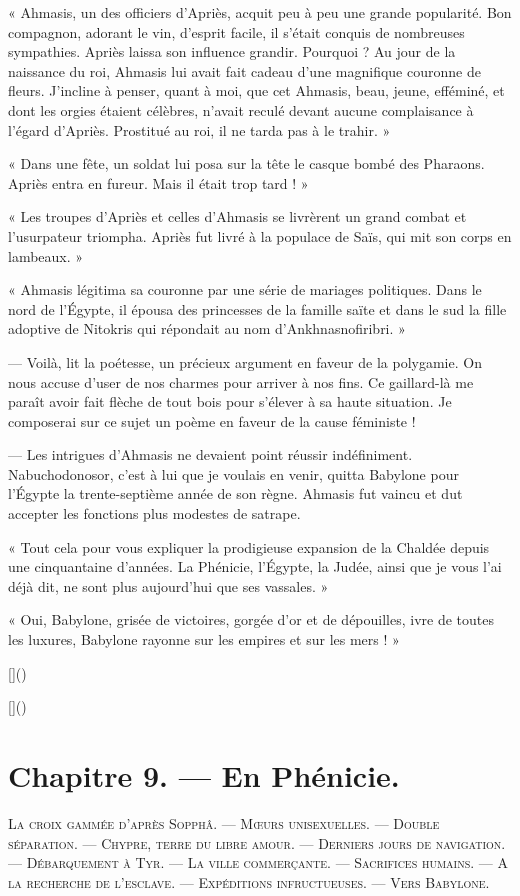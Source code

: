 \documentclass[a4paper, 11pt, oneside, polutonikogreek, french]{article}
\begin{document}
« Ahmasis, un des officiers d'Apriès, acquit peu à peu une grande popularité. Bon compagnon, adorant le vin, d'esprit facile, il s'était conquis de nombreuses sympathies. Apriès laissa son influence grandir. Pourquoi ? Au jour de la naissance du roi, Ahmasis lui avait fait cadeau d'une magnifique couronne de fleurs. J'incline à penser, quant à moi, que cet Ahmasis, beau, jeune, efféminé, et dont les orgies étaient célèbres, n'avait reculé devant aucune complaisance à l'égard d'Apriès. Prostitué au roi, il ne tarda pas à le trahir. »

« Dans une fête, un soldat lui posa sur la tête le casque bombé des Pharaons. Apriès entra en fureur. Mais il était trop tard ! »

« Les troupes d'Apriès et celles d'Ahmasis se livrèrent un grand combat et l'usurpateur triompha. Apriès fut livré à la populace de Saïs, qui mit son corps en lambeaux. »

« Ahmasis légitima sa couronne par une série de mariages politiques. Dans le nord de l'Égypte, il épousa des princesses de la famille saïte et dans le sud la fille adoptive de Nitokris qui répondait au nom d'Ankhnasnofiribri. »

--- Voilà, lit la poétesse, un précieux argument en faveur de la polygamie. On nous accuse d'user de nos charmes pour arriver à nos fins. Ce gaillard-là me paraît avoir fait flèche de tout bois pour s'élever à sa haute situation. Je composerai sur ce sujet un poème en faveur de la cause féministe !

--- Les intrigues d'Ahmasis ne devaient point réussir indéfiniment. Nabuchodonosor, c'est à lui que je voulais en venir, quitta Babylone pour l'Égypte la trente-septième année de son règne. Ahmasis fut vaincu et dut accepter les fonctions plus modestes de satrape.

« Tout cela pour vous expliquer la prodigieuse expansion de la Chaldée depuis une cinquantaine d'années. La Phénicie, l'Égypte, la Judée, ainsi que je vous l'ai déjà dit, ne sont plus aujourd'hui que ses vassales. »

« Oui, Babylone, grisée de victoires, gorgée d'or et de dépouilles, ivre de toutes les luxures, Babylone rayonne sur les empires et sur les mers ! »

[]()

[]()
\clearpage
\section{Chapitre 9. --- En Phénicie.}
\begin{center}
\scshape
\small
La croix gammée d'après Sopphâ. --- Mœurs unisexuelles. --- Double séparation. --- Chypre, terre du libre amour. --- Derniers jours de navigation. --- Débarquement à Tyr. --- La ville commerçante. --- Sacrifices humains. --- A la recherche de l'esclave. --- Expéditions infructueuses. --- Vers Babylone.
\end{center}
\end{document}
